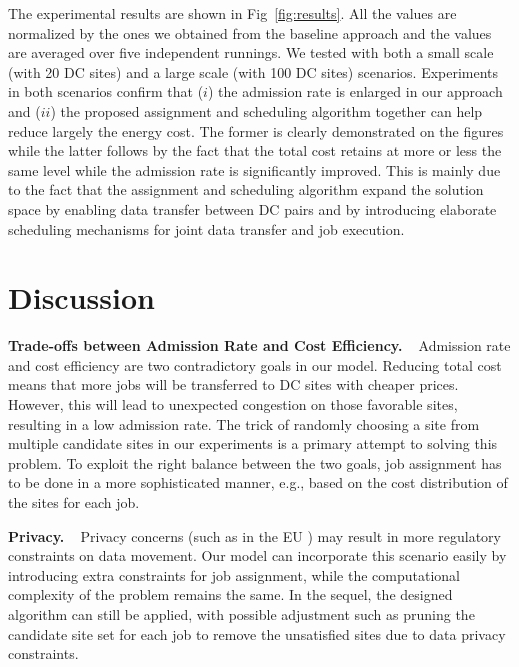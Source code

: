 \documentclass{article}
\newcommand{\bpara}[2]{\noindent\textbf{#1~~}{#2}}
\begin{document}
The experimental results are shown in Fig~\ref{fig:results}. All the values are normalized by the ones we obtained from the baseline approach and the values are averaged over five independent runnings. We tested with both a small scale (with 20 DC sites) and a large scale (with 100 DC sites) scenarios.  Experiments in both scenarios confirm that ($\mathit{i}$) the admission rate is enlarged in our approach and ($\mathit{ii}$) the proposed assignment and scheduling algorithm together can help reduce largely the energy cost. The former is clearly demonstrated on the figures while the latter follows by the fact that the total cost retains at more or less the same level while the admission rate is significantly improved. This is mainly due to the fact that the assignment and scheduling algorithm expand the solution space by enabling data transfer between DC pairs and by introducing elaborate scheduling mechanisms for joint data transfer and job execution.


\section{Discussion}
\label{sec:disc}

\bpara{Trade-offs between Admission Rate and Cost Efficiency.}
Admission rate and cost efficiency are two contradictory goals in our model. Reducing total cost means that more jobs will be transferred to DC sites with cheaper prices. However, this will lead to unexpected congestion on those favorable sites, resulting in a low admission rate. The trick of randomly choosing a site from multiple candidate sites in our experiments is a primary attempt to solving this problem. To exploit the right balance between the two goals, job assignment has to be done in a more sophisticated manner, e.g., based on the cost distribution of the sites for each job. 

\bpara{Privacy.}
Privacy concerns (such as in the EU \cite{EU-privacy-2014}) may result in more regulatory constraints on data movement. Our model can incorporate this scenario easily by introducing extra constraints for job assignment, while the computational complexity of the problem remains the same. In the sequel, the designed algorithm can still be applied, with possible adjustment such as pruning the candidate site set for each job to remove the unsatisfied sites due to data privacy constraints.
\end{document}
